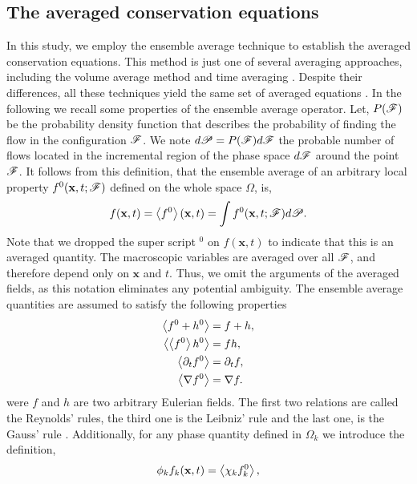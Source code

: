 \subsection{The averaged conservation equations}
\label{sec:avg_def}
In this study, we employ the ensemble average technique to establish the averaged conservation equations. 
This method is just one of several averaging approaches, including the volume average method \citep{jackson1997locally} and time averaging \citep{ishii2010thermo}. 
Despite their differences, all these techniques yield the same set of averaged equations \citep{jackson1997locally,zhang1997momentum}.
In the following we recall some properties of the ensemble average operator. 
Let, $P(\mathscr{F})$ be the probability density function that describes the probability of finding the flow in the configuration $\mathscr{F}$. 
We note $d\mathscr{P} = P(\mathscr{F}) d\mathscr{F}$ the probable number of flows located in the incremental region of the phase space $d\mathscr{F}$ around the point $\mathscr{F}$. 
It follows from this definition, that the ensemble average of an arbitrary local property $f^0(\textbf{x},t;\mathscr{F})$ defined on the whole space $\Omega$, is,
\begin{equation}
    f(\textbf{x},t)
    = \left<f^0\right>(\textbf{x},t)
    =\int f^0(\textbf{x},t;\mathscr{F}) d\mathscr{P}. 
    \label{eq:avg}
\end{equation}  
Note that we dropped the super script $^0$ on $f(\textbf{x},t)$ to indicate that this is an averaged quantity. 
The macroscopic variables are averaged over all $\mathscr{F}$, and therefore depend only on $\textbf{x}$ and $t$.
Thus, we omit the arguments of the averaged fields, as this notation eliminates any potential ambiguity. 
The ensemble average quantities are assumed to satisfy the following properties \citep{drew1983mathematical}
\begin{align}
    \label{eq:avg_properties}
    \left<f^0+h^0\right> &= f+h, \\ 
    \left<\left<f^0\right>h^0\right> &= fh, \\
    \left<\partial_t f^0\right> 
    &= \partial_t f, \\ 
    \left<\mathbf{\nabla} f^0\right>
    &= \mathbf{\nabla} f. 
\end{align}
were $f$ and $h$ are two arbitrary Eulerian fields. 
The first two relations are called the Reynolds' rules, the third one is the Leibniz' rule and the last one, is the Gauss' rule \citep{drew1983mathematical}.
Additionally, for any phase quantity defined in $\Omega_k$ we introduce the definition, 
\begin{equation}
    \phi_k f_k (\textbf{x},t) = \left<\chi_k f_k^0\right>,
    \label{eq:1_avg}
\end{equation}
